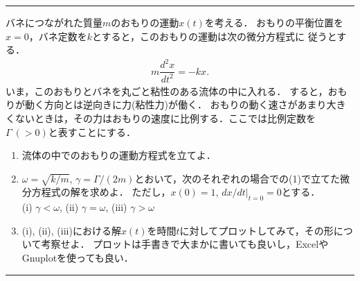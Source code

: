 \newpage
\vspace*{.2cm}
\hrule
\enshu
バネにつながれた質量$m$のおもりの運動$x(t)$を考える．
おもりの平衡位置を$x=0$，バネ定数を$k$とすると，このおもりの運動は次の微分方程式に
従うとする．
\begin{align*}
  m\dfrac{d^2x}{dt^2} = -k x. 
\end{align*}
いま，このおもりとバネを丸ごと粘性のある流体の中に入れる．
すると，おもりが動く方向とは逆向きに力(粘性力)が働く．
おもりの動く速さがあまり大きくないときは，その力はおもりの速度に比例する．ここでは比例定数を$\Gamma ~(>0)$と表すことにする．
\begin{enumerate}[(1)]
  \item 流体の中でのおもりの運動方程式を立てよ．
  \item $\omega=\sqrt{k/m}$, $\gamma = \Gamma/(2m)$とおいて，次のそれぞれの場合での(1)で立てた微分方程式の解を求めよ．
	ただし，$x(0)=1$, $dx/dt|_{t=0} = 0$とする．\\
	(i) $\gamma < \omega$, (ii) $\gamma = \omega$, (iii) $\gamma > \omega$
  \item (i), (ii), (iii)における解$x(t)$を時間$t$に対してプロットしてみて，その形について考察せよ．
	プロットは手書きで大まかに書いても良いし，ExcelやGnuplotを使っても良い．
\end{enumerate}
\vspace*{.2cm}
\hrule


